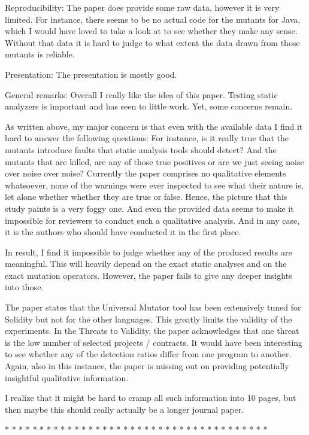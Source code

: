 Reproducibility:
The paper does provide some raw data, however it is very limited. For instance, there seems to be no actual code for the mutants for Java, which I would have loved to take a look at to see whether they make any sense. Without that data it is hard to judge to what extent the data drawn from those mutants is reliable.

Presentation:
The presentation is mostly good.

General remarks:
Overall I really like the idea of this paper. Testing static analyzers is important and has seen to little work. Yet, some concerns remain.

As written above, my major concern is that even with the available data I find it hard to answer the following questions: For instance, is it really true that the mutants introduce faults that static analysis tools should detect? And the mutants that are killed, are any of those true positives or are we just seeing noise over noise over noise? Currently the paper comprises no qualitative elements whatsoever, none of the warnings were ever inspected to see what their nature is, let alone whether whether they are true or false. Hence, the picture that this study paints is a very foggy one. And even the provided data seems to make it impossible for reviewers to conduct such a qualitative analysis. And in any case, it is the authors who should have conducted it in the first place.

In result, I find it impossible to judge whether any of the produced results are meaningful. This will heavily depend on the exact static analyses and on the exact mutation operators. However, the paper fails to give any deeper insights into those.

The paper states that the Universal Mutator tool has been extensively tuned for Solidity but not for the other languages. This greatly limits the validity of the experiments.
In the Threats to Validity, the paper acknowledges that one threat is the low number of selected projects / contracts. It would have been interesting to see whether any of the detection ratios differ from one program to another. Again, also in this instance, the paper is missing out on providing potentially insightful qualitative information.

I realize that it might be hard to cramp all such information into 10 pages, but then maybe this should really actually be a longer journal paper.


* * * * * * * * * * * * * * * * * * * * * * * * * * * * * * * * * * * * * *


